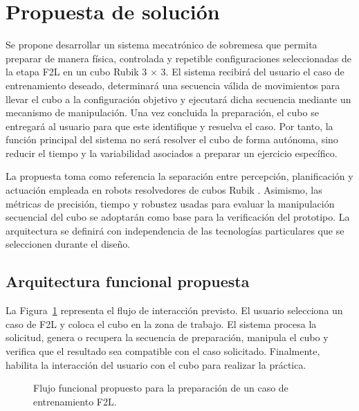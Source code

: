 \section{Propuesta de solución}

Se propone desarrollar un sistema mecatrónico de sobremesa que permita preparar de manera física, controlada y repetible configuraciones seleccionadas de la etapa F2L en un cubo Rubik 3 $\times$ 3. El sistema recibirá del usuario el caso de entrenamiento deseado, determinará una secuencia válida de movimientos para llevar el cubo a la configuración objetivo y ejecutará dicha secuencia mediante un mecanismo de manipulación. Una vez concluida la preparación, el cubo se entregará al usuario para que este identifique y resuelva el caso. Por tanto, la función principal del sistema no será resolver el cubo de forma autónoma, sino reducir el tiempo y la variabilidad asociados a preparar un ejercicio específico.

La propuesta toma como referencia la separación entre percepción, planificación y actuación empleada en robots resolvedores de cubos Rubik \cite{Novakova2018,Gorriz2023}. Asimismo, las métricas de precisión, tiempo y robustez usadas para evaluar la manipulación secuencial del cubo \cite{Yang2020} se adoptarán como base para la verificación del prototipo. La arquitectura se definirá con independencia de las tecnologías particulares que se seleccionen durante el diseño.

\subsection{Arquitectura funcional propuesta}

La Figura~\ref{fig:flujo-entrenamiento-f2l} representa el flujo de interacción previsto. El usuario selecciona un caso de F2L y coloca el cubo en la zona de trabajo. El sistema procesa la solicitud, genera o recupera la secuencia de preparación, manipula el cubo y verifica que el resultado sea compatible con el caso solicitado. Finalmente, habilita la interacción del usuario con el cubo para realizar la práctica.

\begin{figure}[H]
    \centering
    \caption{Flujo funcional propuesto para la preparación de un caso de entrenamiento F2L.}
    \label{fig:flujo-entrenamiento-f2l}
\end{figure}

